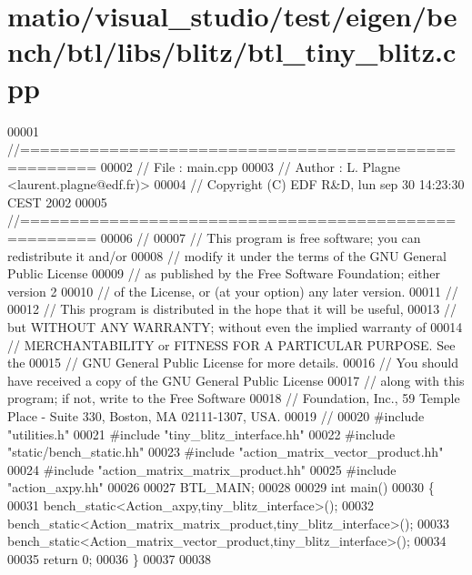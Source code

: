 \hypertarget{matio_2visual__studio_2test_2eigen_2bench_2btl_2libs_2blitz_2btl__tiny__blitz_8cpp_source}{}\section{matio/visual\+\_\+studio/test/eigen/bench/btl/libs/blitz/btl\+\_\+tiny\+\_\+blitz.cpp}
\label{matio_2visual__studio_2test_2eigen_2bench_2btl_2libs_2blitz_2btl__tiny__blitz_8cpp_source}

\begin{DoxyCode}
00001 \textcolor{comment}{//=====================================================}
00002 \textcolor{comment}{// File   :  main.cpp}
00003 \textcolor{comment}{// Author :  L. Plagne <laurent.plagne@edf.fr)>}
00004 \textcolor{comment}{// Copyright (C) EDF R&D,  lun sep 30 14:23:30 CEST 2002}
00005 \textcolor{comment}{//=====================================================}
00006 \textcolor{comment}{//}
00007 \textcolor{comment}{// This program is free software; you can redistribute it and/or}
00008 \textcolor{comment}{// modify it under the terms of the GNU General Public License}
00009 \textcolor{comment}{// as published by the Free Software Foundation; either version 2}
00010 \textcolor{comment}{// of the License, or (at your option) any later version.}
00011 \textcolor{comment}{//}
00012 \textcolor{comment}{// This program is distributed in the hope that it will be useful,}
00013 \textcolor{comment}{// but WITHOUT ANY WARRANTY; without even the implied warranty of}
00014 \textcolor{comment}{// MERCHANTABILITY or FITNESS FOR A PARTICULAR PURPOSE.  See the}
00015 \textcolor{comment}{// GNU General Public License for more details.}
00016 \textcolor{comment}{// You should have received a copy of the GNU General Public License}
00017 \textcolor{comment}{// along with this program; if not, write to the Free Software}
00018 \textcolor{comment}{// Foundation, Inc., 59 Temple Place - Suite 330, Boston, MA  02111-1307, USA.}
00019 \textcolor{comment}{//}
00020 \textcolor{preprocessor}{#include "utilities.h"}
00021 \textcolor{preprocessor}{#include "tiny\_blitz\_interface.hh"}
00022 \textcolor{preprocessor}{#include "static/bench\_static.hh"}
00023 \textcolor{preprocessor}{#include "action\_matrix\_vector\_product.hh"}
00024 \textcolor{preprocessor}{#include "action\_matrix\_matrix\_product.hh"}
00025 \textcolor{preprocessor}{#include "action\_axpy.hh"}
00026 
00027 BTL\_MAIN;
00028 
00029 \textcolor{keywordtype}{int} main()
00030 \{
00031   bench\_static<Action\_axpy,tiny\_blitz\_interface>();
00032   bench\_static<Action\_matrix\_matrix\_product,tiny\_blitz\_interface>();
00033   bench\_static<Action\_matrix\_vector\_product,tiny\_blitz\_interface>();
00034 
00035   \textcolor{keywordflow}{return} 0;
00036 \}
00037 
00038 
\end{DoxyCode}
